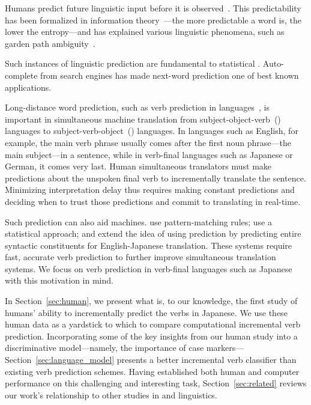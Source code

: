 Humans predict future linguistic input before it is
observed~\cite{kutas-11}. This predictability has been formalized in
information theory~\cite{shannon-1948}---the more predictable a word
is, the lower the entropy---and has explained various linguistic
phenomena, such as garden path ambiguity~\cite{den-1997,hale-2001}.

Such instances of linguistic prediction are fundamental to statistical
. Auto-complete from search engines has made next-word
prediction one of best known  applications.





Long-distance word prediction, such as verb prediction in 
languages~\cite{levy2013expectation,momma2015timing,chow2015bag}, is
important in simultaneous machine translation from
subject-object-verb~() languages to
subject-verb-object~() languages.  In  languages
such as English, for example, the main verb phrase usually comes after
the first noun phrase---the main subject---in a sentence, while in
verb-final languages such as Japanese or German, it comes very last.
Human simultaneous translators must make predictions about the
unspoken final verb to incrementally translate the sentence.
Minimizing interpretation delay thus requires making constant
predictions and deciding when to trust those predictions and commit to
translating in real-time.

Such prediction can also aid machines.   use
pattern-matching rules;  use a
statistical \ngram{} approach; and  extend the
idea of using prediction by predicting entire syntactic constituents
for English-Japanese translation.  These systems require fast,
accurate verb prediction to further improve simultaneous translation
systems.  We focus on verb prediction in verb-final languages such as
Japanese with this motivation in mind.

In Section~\ref{sec:human}, we present what is, to our knowledge, the
first study of humans' ability to incrementally predict the verbs in
Japanese.  We use these human data as a yardstick to which to compare
computational incremental verb prediction.  Incorporating some of the
key insights from our human study into a discriminative
model---namely, the importance of case markers---
Section~\ref{sec:language_model} presents a better incremental verb
classifier than existing verb prediction schemes.  Having established
both human and computer performance on this challenging and
interesting task, Section~\ref{sec:related} reviews our work's
relationship to other studies in  and linguistics.
